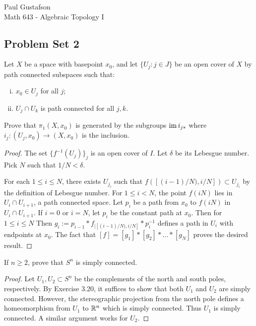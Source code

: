 \documentclass{article}
\begin{document}
\noindent Paul Gustafson\\
\noindent Math 643 - Algebraic Topology I

\subsection*{Problem Set 2} 
 Let $X$ be a space with basepoint $x_0$, and let $\{U_j : j \in J\}$ be an open cover of $X$
by path connected subspaces such that:
\begin{enumerate}[(i)]
\item $x_0 \in U_j$ for all $j$;
\item $U_j \cap U_k$ is path connected for all $j,k$.
\end{enumerate}
Prove that $\pi_1(X,x_0)$ is generated by the subgroups $\operatorname{im} i_{j*}$ where $i_j:(U_j, x_0) \to (X, x_0)$ is the inclusion.
\begin{proof}
The set $\{f^{-1}(U_j)\}_j$ is an open cover of $I$. Let $\delta$ be its Lebesgue number. Pick $N$ such that $1/N < \delta$.

For each $1 \le i \le N$, there exists $U_{j_i}$ such that $f([(i-1)/N), i/N]) \subset U_{j_i}$ by the definition of Lebesgue number.
For $1 \le i < N$, the point $f(iN)$ lies in $U_i \cap U_{i+1}$, a path connected space.  Let $p_i$ be a path from $x_0$ to $f(iN)$
in $U_i \cap U_{i+1}$. If $i = 0$ or $i=N$, let $p_i$ be the constant path at $x_0$.
Then for $1 \le i \le N$ Then $g_i := p_{i-1} * f_{|[(i-1)/N), i/N]} * p_{i}^{-1}$ defines a path in $U_i$ with endpoints at $x_0$.
The fact that $[f] = [g_1]*[g_2]* \ldots * [g_N]$ proves the desired result.
\end{proof}

 If $n \ge 2$, prove that $S^n$ is simply connected.
\begin{proof}
Let $U_1, U_2 \subset S^n$ be the complements of the north and south poles, respectively.  By Exercise 3.20,
it suffices to show that both $U_1$ and $U_2$ are simply connected.  However, the stereographic projection
from the north pole defines a homeomorphism from $U_1$ to $\mathbb{R}^n$ which is simply connected. Thus $U_1$ is
simply connected.  A similar argument works for $U_2$.
\end{proof}
\end{document}
